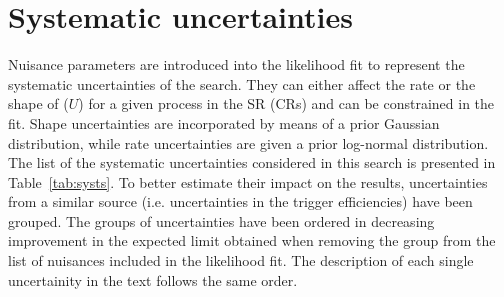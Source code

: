 \section{Systematic uncertainties}

Nuisance parameters are introduced into the likelihood fit to represent the systematic uncertainties of the search. They can either affect the rate or  the shape of \ptmiss ($U$) for a given process in the SR (CRs) and can be constrained in the fit. Shape uncertainties are incorporated by means of a prior Gaussian distribution, while rate uncertainties are given a prior log-normal distribution. The list of the systematic uncertainties considered in this search is presented in Table~\ref{tab:systs}. To better estimate their impact on the results, uncertainties from a similar source (i.e. uncertainties in the trigger efficiencies) have been grouped. The groups of uncertainties have been ordered in decreasing improvement in the expected limit obtained when removing the group from the list of nuisances included in the likelihood fit. The description of each single uncertainity in the text follows the same order.

